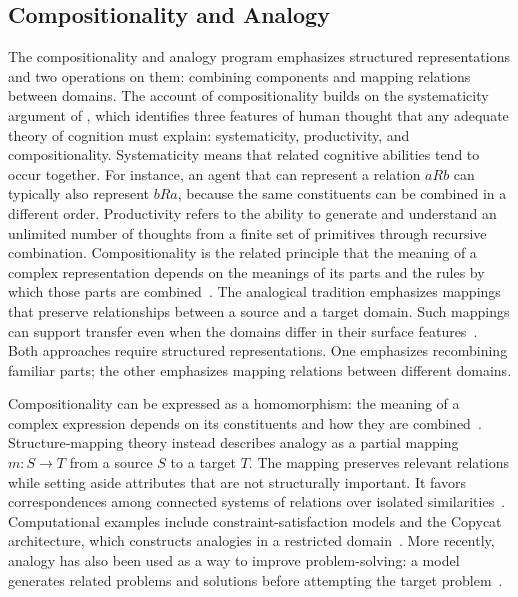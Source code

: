 \documentclass[acmsmall,screen,review,anonymous]{acmart}
\begin{document}
\subsection{Compositionality and Analogy}
\label{subsec:ontology-comp}
The compositionality and analogy program emphasizes structured representations and two operations on them: combining components and mapping relations between domains.
%
The account of compositionality builds on the systematicity argument of \citet{fodorpylyshyn1988}, which identifies three features of human thought that any adequate theory of cognition must explain: systematicity, productivity, and compositionality.
%
Systematicity means that related cognitive abilities tend to occur together.
%
For instance, an agent that can represent a relation $aRb$ can typically also represent $bRa$, because the same constituents can be combined in a different order.
%
Productivity refers to the ability to generate and understand an unlimited number of thoughts from a finite set of primitives through recursive combination.
%
Compositionality is the related principle that the meaning of a complex representation depends on the meanings of its parts and the rules by which those parts are combined~\citep{fodorpylyshyn1988, marcus2019}. 
%
The analogical tradition emphasizes mappings that preserve relationships between a source and a target domain.
%
Such mappings can support transfer even when the domains differ in their surface features~\citep{hofstadter2001, Mitchell_2021}.
%
Both approaches require structured representations.
%
One emphasizes recombining familiar parts; the other emphasizes mapping relations between different domains.
 
Compositionality can be expressed as a homomorphism: the meaning of a complex expression depends on its constituents and how they are combined~\citep{fodorpylyshyn1988}.
%
Structure-mapping theory instead describes analogy as a partial mapping $m \colon S \to T$ from a source $S$ to a target $T$.
%
The mapping preserves relevant relations while setting aside attributes that are not structurally important.
%
It favors correspondences among connected systems of relations over isolated similarities~\citep{gentner2017analogy, GENTNER1983155}.
%
Computational examples include constraint-satisfaction models and the Copycat architecture, which constructs analogies in a restricted domain~\citep{HOLYOAK1989295,holyoak1994analogy, Hofstadter1995TheCP}.
%
More recently, analogy has also been used as a way to improve problem-solving: a model generates related problems and solutions before attempting the target problem~\citep{yasunaga2024large}.
\end{document}
